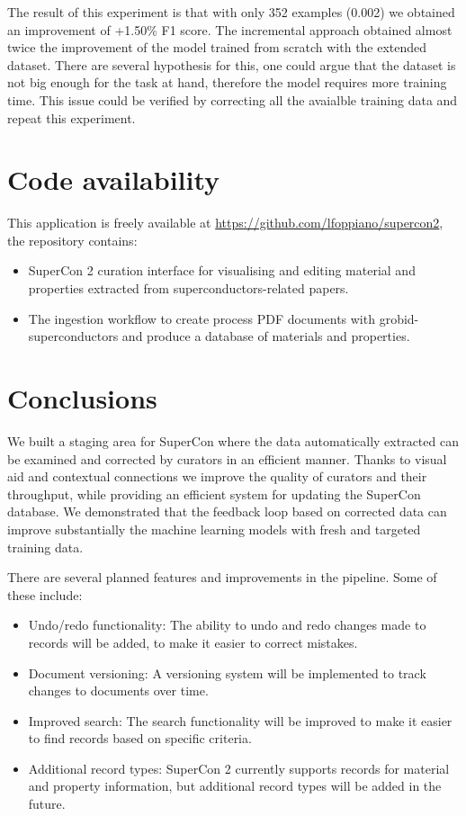 \documentclass{article}
\begin{document}
The result of this experiment is that with only 352 examples (0.002) we obtained an improvement of +1.50\% F1 score. The incremental approach obtained almost twice the improvement of the model trained from scratch with the extended dataset. 
There are several hypothesis for this, one could argue that the dataset is not big enough for the task at hand, therefore the model requires more training time. This issue could be verified by correcting all the avaialble training data and repeat this experiment. 


\section{Code availability}
This application is freely available at \url{https://github.com/lfoppiano/supercon2}, the repository contains:
\begin{itemize}
\item SuperCon 2 curation interface for visualising and editing material and properties extracted from superconductors-related papers.
\item The ingestion workflow to create process PDF documents with grobid-superconductors and produce a database of materials and properties.
\end{itemize}

\section{Conclusions}
We built a staging area for SuperCon where the data automatically extracted can be examined and corrected by curators in an efficient manner. Thanks to visual aid and contextual connections we improve the quality of curators and their throughput, while providing an efficient system for updating the SuperCon database. 
We demonstrated that the feedback loop based on corrected data can improve substantially the machine learning models with fresh and targeted training data. 

There are several planned features and improvements in the pipeline. Some of these include:

\begin{itemize}
    \item Undo/redo functionality: The ability to undo and redo changes made to records will be added, to make it easier to correct mistakes.
    \item Document versioning: A versioning system will be implemented to track changes to documents over time.
    \item Improved search: The search functionality will be improved to make it easier to find records based on specific criteria.
    \item Additional record types: SuperCon 2 currently supports records for material and property information, but additional record types will be added in the future.
\end{itemize}



\end{document}
